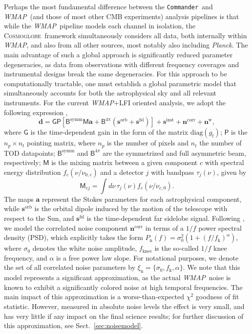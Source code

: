 \documentclass[twocolumn]{../../common/aa}
\def\WMAP{\emph{WMAP}}
\def\Planck{\emph{Planck}}
\def\commander{\texttt{Commander}}
\newcommand{\cosmoglobe}{\textsc{Cosmoglobe}}
\begin{document}
Perhaps the most fundamental difference between the \commander\ and \WMAP\ (and those of most other CMB experiments) analysis pipelines is that while the \WMAP\ pipeline models each channel in isolation, the \cosmoglobe\ framework simultaneously considers all data, both internally within \WMAP, and also from all other sources, most notably also including \Planck. The main advantage of such a global approach is significantly reduced parameter degeneracies, as data from observations with different frequency coverages and instrumental designs break the same degeneracies. For this approach to be computationally tractable, one must establish a global parametric model that simultaneously accounts for both the astrophysical sky and all relevant instruments. For the current \WMAP+LFI oriented analysis, we adopt the following expression \citep{bp01},
\begin{equation}
	\label{eq:model}
	\boldsymbol d =\mathsf G\mathsf P[\mathsf B^\mathrm{symm}\mathsf M\boldsymbol a+\mathsf B^\mathrm{4\pi}(\boldsymbol s^\mathrm{orb}
	+\boldsymbol s^\mathrm{fsl})] + \boldsymbol s^\mathrm{inst}+ \boldsymbol n^\mathrm{corr}+\boldsymbol n^\mathrm w,
\end{equation}
where $\mathsf G$ is the time-dependent gain in the form of the matrix $\mathrm{diag}(g_t)$; $\mathsf P$ is the $n_p\times n_t$ pointing matrix, where $n_p$ is the number of pixels and $n_t$ the number of TOD datapoints;
$\mathsf B^\mathrm{symm}$ and $\mathsf B^{4\pi}$ are the symmetrized and full asymmetric beam, respectively; $\mathsf M$ is the mixing matrix between a given component $c$ with spectral energy distribution $f_c(\nu/\nu_{0,c})$ and a detector $j$ with bandpass $\tau_j(\nu)$, given by
\begin{equation}
	\mathsf M_{cj}=\int d\nu\,\tau_j(\nu)f_c(\nu/\nu_{c,0}).
\end{equation}
The maps $\boldsymbol a$ represent the Stokes parameters for each astrophysical component, while $\boldsymbol s^\mathrm{orb}$ is the orbital dipole induced by the motion of the telescope with respect to the Sun, and $\boldsymbol s^\mathrm{fsl}$ is the time-dependent far sidelobe signal. Following \citet{bp06}, we model the correlated noise component $\boldsymbol n^\mathrm{corr}$ in terms of a $1/f$ power spectral density (PSD), which explicitly takes the form $P_\mathrm{n}(f) = \sigma^2_0 (1 + (f/f_\mathrm{k})^\alpha)$, where $\sigma_0$ denotes the white noise amplitude, $f_\mathrm{knee}$ is the so-called $1/f$ knee frequency, and $\alpha$ is a free power law slope. For notational purposes, we denote the set of all correlated noise parameters by $\xi_{\mathrm{n}} = \{\sigma_0, f_{\mathrm{k}}, \alpha\}$. We note that this model represents a significant approximation, as the actual \WMAP\ noise is known to exhibit a significantly colored noise at high temporal frequencies. The main impact of this approximation is a worse-than-expected $\chi^2$ goodness of fit statistic. However, measured in absolute noise levels the effect is very small, and has very little if any impact on the final science results; for further discussion of this approximation, see Sect.~\ref{sec:noisemodel}. 
\end{document}

